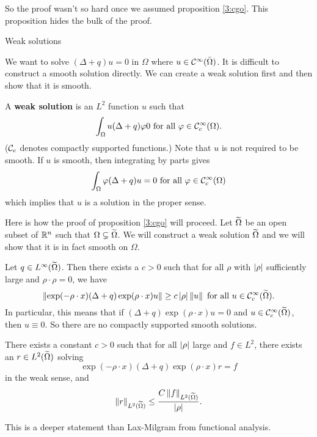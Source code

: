 So the proof wasn't so hard once we assumed proposition \ref{3:cgo}.
This proposition hides the bulk of the proof.

Weak solutions

We want to solve $(\Delta+q)u=0$ in $\Omega$ where $u \in \mathcal{C}^\infty(\bar\Omega)$.
It is difficult to construct a smooth solution directly.
We can create a weak solution first and then show that it is smooth.

\begin{defn}
  A \textbf{weak solution} is an $L^2$ function $u$ such that
  \[ \int_\Omega u(\Delta+q)\varphi 0 \text{ for all } \varphi \in \mathcal{C}_c^\infty(\Omega). \]
  ($\mathcal{C}_c$ denotes compactly supported functions.)
  Note that $u$ is not required to be smooth.
  If $u$ is smooth, then integrating by parts gives
  \[ \int_\Omega \varphi(\Delta+q)u=0 \text{ for all } \varphi \in \mathcal{C}_c^\infty(\Omega) \]
  which implies that $u$ is a solution in the proper sense.
\end{defn}

Here is how the proof of proposition \ref{3:cgo} will proceed.
Let $\widetilde\Omega$ be an open subset of $\mathbb{R}^n$ such that $\Omega \subsetneq \widetilde\Omega$.
We will construct a weak solution $\widetilde\Omega$ and we will show that it is in fact smooth on $\Omega$.

\begin{prop}\label{3:est}
  Let $q \in L^\infty(\widetilde\Omega)$.
  Then there exists a $c>0$ such that for all $\rho$ with $\left\lvert \rho \right\rvert$ sufficiently large and $\rho\cdot\rho=0$, we have
  \[ \left\lVert \exp(-\rho \cdot x)(\Delta+q)\exp(\rho\cdot x) u \right\rVert \geq c\left\lvert \rho \right\rvert\left\lVert u \right\rVert \text{ for all } u \in \mathcal{C}_c^\infty(\widetilde\Omega). \]
  In particular, this means that if $(\Delta+q)\exp(\rho\cdot x)u=0$ and $u \in \mathcal{C}_c^\infty(\widetilde\Omega)$, then $u \equiv 0$.
  So there are no compactly supported smooth solutions.
\end{prop}

\begin{cor}[Solvability]\label{3:solv}
  There exists a constant $c>0$ such that for all $\left\lvert \rho \right\rvert$ large and $f \in L^2$, there exists an $r \in L^2(\widetilde\Omega)$ solving 
  \[ \exp(-\rho\cdot x)(\Delta+q)\exp(\rho\cdot x)r=f \]
  in the weak sense, and
  \[ \left\lVert r \right\rVert_{L^2(\widetilde\Omega)} \leq \frac{C\left\lVert f \right\rVert_{L^2(\widetilde\Omega)}}{\left\lvert \rho \right\rvert}. \]
\end{cor}

This is a deeper statement than Lax-Milgram from functional analysis.

